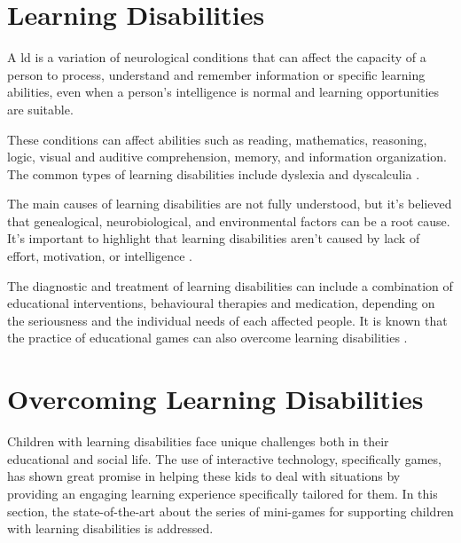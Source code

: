\section{Learning Disabilities}
\label{section:learningdisabilityexplanation}
A \gls{ld} is a variation of neurological conditions that can affect the capacity of a person to process, understand and remember information or specific learning abilities, even when a person’s intelligence is normal and learning opportunities are suitable.

These conditions can affect abilities such as reading, mathematics, reasoning, logic, visual and auditive comprehension, memory, and information organization. The common types of learning disabilities include dyslexia and dyscalculia \cite{NINDSLearningDisabilities}.


The main causes of learning disabilities are not fully understood, but it’s believed that genealogical, neurobiological, and environmental factors can be a root cause. It’s important to highlight that learning disabilities aren’t caused by lack of effort, motivation, or intelligence \cite{UniversityWashingtonLearningDisabilities}.

The diagnostic and treatment of learning disabilities can include a combination of educational interventions, behavioural therapies and medication, depending on the seriousness and the individual needs of each affected people. It is known that the practice of educational games can also overcome learning disabilities \cite{NINDSLearningDisabilities}.

\newpage
\section{Overcoming Learning Disabilities}
\label{sec:overcomingLds}

Children with learning disabilities face unique challenges both in their educational and social life. The use of interactive technology, specifically games, has shown great promise in helping these kids to deal with situations by providing an engaging learning experience specifically tailored for them. In this section, the state-of-the-art about the series of mini-games for supporting children with learning disabilities is addressed.

